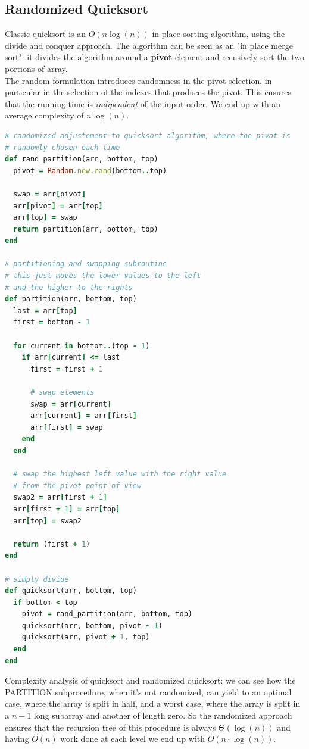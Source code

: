 \documentclass{article}
\begin{document}
			\subsection{Randomized Quicksort}
			Classic quicksort is an $O(n \log (n))$ in place sorting algorithm, using the divide and conquer approach. The algorithm can be seen as an "in place merge sort": it divides the algorithm around a \textbf{pivot} element and recusively sort the two portions of array.\\
			The random formulation introduces randomness in the pivot selection, in particular in the selection of the indexes that produces the pivot. This ensures that the running time is \textit{indipendent} of the input order. We end up with an average complexity of $n \log (n)$.
			\begin{lstlisting}[language=Ruby]
# randomized adjustement to quicksort algorithm, where the pivot is 
# randomly chosen each time
def rand_partition(arr, bottom, top)
  pivot = Random.new.rand(bottom..top)

  swap = arr[pivot]
  arr[pivot] = arr[top]
  arr[top] = swap
  return partition(arr, bottom, top)
end

# partitioning and swapping subroutine
# this just moves the lower values to the left 
# and the higher to the rights
def partition(arr, bottom, top)
  last = arr[top]
  first = bottom - 1

  for current in bottom..(top - 1)
    if arr[current] <= last
      first = first + 1

      # swap elements
      swap = arr[current]
      arr[current] = arr[first]
      arr[first] = swap
    end
  end

  # swap the highest left value with the right value
  # from the pivot point of view
  swap2 = arr[first + 1]
  arr[first + 1] = arr[top]
  arr[top] = swap2

  return (first + 1)
end

# simply divide
def quicksort(arr, bottom, top)
  if bottom < top
    pivot = rand_partition(arr, bottom, top)
    quicksort(arr, bottom, pivot - 1)
    quicksort(arr, pivot + 1, top)
  end
end              
				\end{lstlisting}
				Complexity analysis of quicksort and randomized quicksort: we can see how the PARTITION subprocedure, when it's not randomized, can yield to an optimal case, where the array is split in half, and a worst case, where the array is split in a $n-1$ long subarray and another of length zero. So the randomized approach ensures that the recursion tree of this procedure is always $\Theta(\log(n))$ and having $O(n)$ work done at each level we end up with $O(n \cdot \log(n))$.\\
\end{document}
